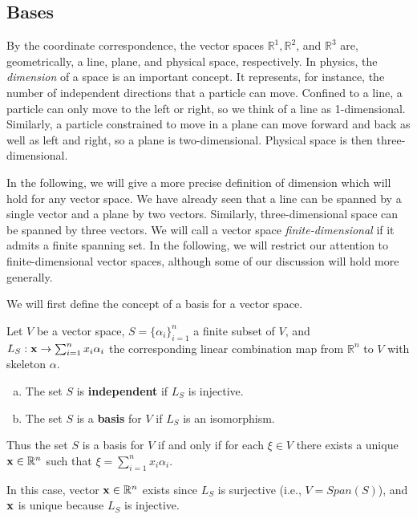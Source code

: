 \documentclass[12pt,letterpaper,reqno]{article}
\numberwithin{equation}{section}
\newcommand{\ti}[1]{\textit{#1}}
\begin{document}
\subsection{Bases}
By the coordinate correspondence, the vector spaces $\mathbb{R}^1,\mathbb{R}^2$, and $\mathbb{R}^3$ are, geometrically, a line, plane, and physical space, respectively. In physics, the \ti{dimension} of a space is an important concept. It represents, for instance, the number of independent directions that a particle can move. Confined to a line, a particle can only move to the left or right, so we think of a line as 1-dimensional. Similarly, a particle constrained to move in a plane can move forward and back as well as left and right, so a plane is two-dimensional. Physical space is then three-dimensional.

In the following, we will give a more precise definition of dimension which will hold for any vector space. We have already seen that a line can be spanned by a single vector and a plane by two vectors. Similarly, three-dimensional space can be spanned by three vectors. We will call a vector space \ti{finite-dimensional} if it admits a finite spanning set. In the following, we will restrict our attention to finite-dimensional vector spaces, although some of our discussion will hold more generally.

We will first define the concept of a basis for a vector space. 

\begin{defn} Let $V$ be a vector space, $S=\{\alpha_i\}_{i=1}^n$ a finite subset of $V$, and $L_S:{\bf x} \to \sum_{i=1}^nx_i\alpha_i$ the corresponding linear combination map from $\mathbb{R}^n$ to $V$  with skeleton $\alpha$.
\begin{enumerate}[(a)] 
	\item The set $S$ is {\bf independent} if $L_S$ is injective.
	\item The set $S$ is a {\bf basis} for $V$ if $L_S$ is an isomorphism. 
\end{enumerate}	
\end{defn}

Thus the set $S$ is a basis for $V$ if and only if for each $\xi \in V$ there exists a unique ${\bf x} \in \mathbb{R}^n$ such that $\xi=\sum_{i=1}^nx_i\alpha_i$. 

In this case, vector ${\bf x} \in \mathbb{R}^n$ exists since $L_S$ is surjective (i.e., $V=Span (S)$), and ${\bf x}$ is unique because $L_S$ is injective.
\end{document}
